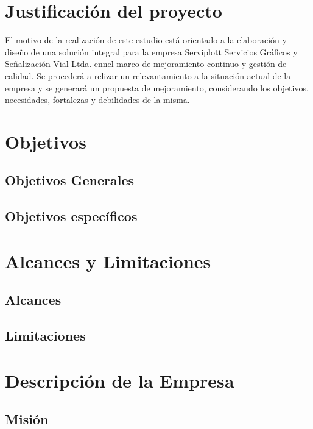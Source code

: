 %
%

\section{Justificación del proyecto}
El motivo de la realización  de este estudio está orientado a la elaboración  y diseño de una solución integral para la empresa Serviplott Servicios Gráficos y Señalización Vial Ltda. ennel marco de mejoramiento continuo y gestión de calidad. Se procederá a relizar un relevantamiento a la situación actual de la empresa y se generará un propuesta de mejoramiento, considerando los objetivos, necesidades, fortalezas y debilidades de la misma.
\section{Objetivos}
\subsection{Objetivos Generales}
\subsection{Objetivos específicos}
\section{Alcances y Limitaciones}
\subsection{Alcances}
\subsection{Limitaciones}
\section{Descripción de la Empresa}
\subsection{Misión}

